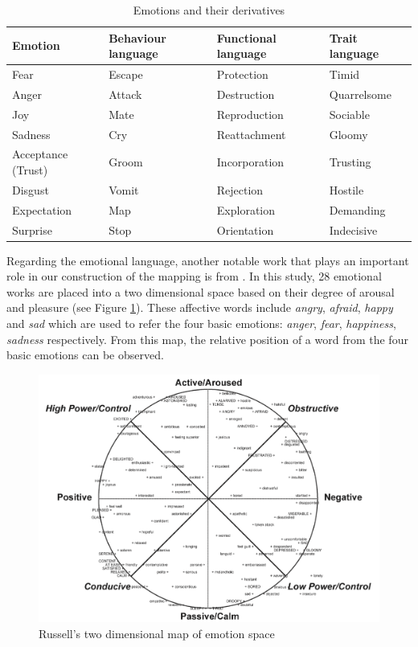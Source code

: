 \begin{table}
\caption{Emotions and their derivatives}
\label{table:derivationOfEmotion}
\centering
\begin{tabular}{|p{3cm}|p{3cm}|p{3cm}|p{3cm}|}
\hline
\textbf{Emotion} & \textbf{Behaviour language} & \textbf{Functional language} & \textbf{Trait language} \\
\hline
Fear & Escape & Protection & Timid \\
\hline
Anger & Attack & Destruction & Quarrelsome \\
\hline
Joy & Mate & Reproduction & Sociable \\
\hline
Sadness & Cry & Reattachment & Gloomy \\
\hline
Acceptance (Trust) & Groom & Incorporation & Trusting \\
\hline
Disgust & Vomit & Rejection & Hostile \\
\hline
Expectation & Map & Exploration & Demanding \\
\hline
Surprise & Stop & Orientation & Indecisive \\
\hline
\end{tabular}
\end{table}

Regarding the emotional language, another notable work that plays an important role in our construction of the mapping is from \citet{russell1980circumplex}. In this study, 28 emotional works are placed into a two dimensional space based on their degree of arousal and pleasure (see Figure \ref{fig:emotionSpace}). These affective words include \textit{angry}, \textit{afraid}, \textit{happy} and \textit{sad} which are used to refer the four basic emotions: \textit{anger}, \textit{fear}, \textit{happiness}, \textit{sadness} respectively. From this map, the relative position of a word from the four basic emotions can be observed.

\begin{figure}[htb!] 
\centering    
\includegraphics[width=1.0\textwidth]{EmotionSpace}
\caption{Russell's two dimensional map of emotion space}
\label{fig:emotionSpace}
\end{figure}

